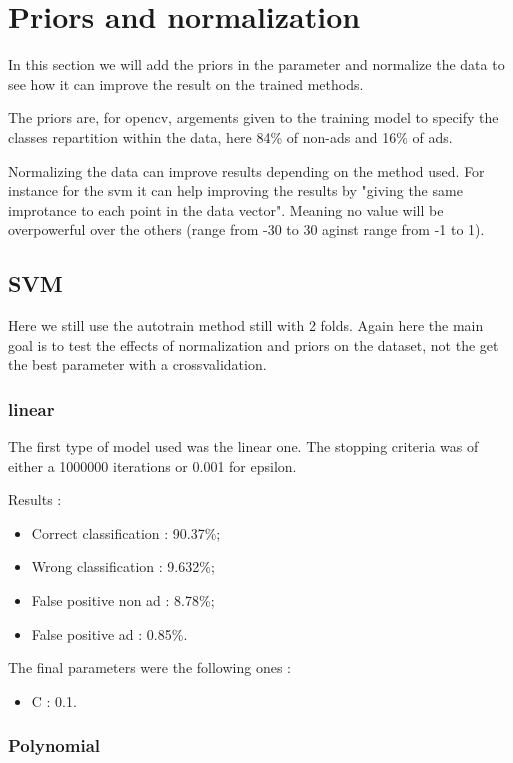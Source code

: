 \section{Priors and normalization}

In this section we will add the priors in the parameter and normalize the data to see how it can improve the result on the trained methods.

The priors are, for opencv, argements given to the training model to specify the classes repartition within the data, here 84\% of non-ads and 16\% of ads.

Normalizing the data can improve results depending on the method used. For instance for the svm it can help improving the results by "giving the same improtance to each point in the data vector". Meaning no value will be overpowerful over the others (range from -30 to 30 aginst range from -1 to 1).

\subsection{SVM}

Here we still use the autotrain method still with 2 folds. Again here the main goal is to test the effects of normalization and priors on the dataset, not the get the best parameter with a crossvalidation.

\subsubsection{linear}

The first type of model used was the linear one. The stopping criteria was of either a 1000000 iterations or 0.001 for epsilon.

Results :
\begin{itemize}
  \item Correct classification : 90.37\%;
  \item Wrong classification : 9.632\%;
  \item False positive non ad : 8.78\%;
  \item False positive ad : 0.85\%.
\end{itemize}

The final parameters were the following ones :
\begin{itemize}
  \item C : 0.1.
\end{itemize}

\subsubsection{Polynomial}

